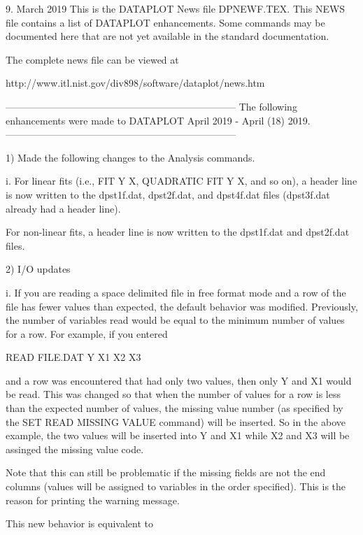 9.
                                                       March  2019
This is the DATAPLOT News file DPNEWF.TEX.  This NEWS file contains a
list of DATAPLOT enhancements.  Some commands may be documented here
that are not yet available in the standard documentation.

The complete news file can be viewed at

    http://www.itl.nist.gov/div898/software/dataplot/news.htm

-----------------------------------------------------------------------
The following enhancements were made to DATAPLOT
April 2019 - April (18) 2019.
-----------------------------------------------------------------------

 1) Made the following changes to the Analysis commands.

      i. For linear fits (i.e., FIT Y X, QUADRATIC FIT Y X, and so on), a
         header line is now written to the dpst1f.dat, dpst2f.dat, and
         dpst4f.dat files (dpst3f.dat already had a header line).

         For non-linear fits, a header line is now written to the dpst1f.dat
         and dpst2f.dat files.

 2) I/O updates

      i. If you are reading a space delimited file in free format mode
         and a row of the file has fewer values than expected, the
         default behavior was modified.  Previously, the number of
         variables read would be equal to the minimum number of values
         for a row.  For example, if you entered

             READ FILE.DAT Y X1 X2 X3

         and a row was encountered that had only two values, then only
         Y and X1 would be read.  This was changed so that when the number
         of values for a row is less than the expected number of values,
         the missing value number (as specified by the SET READ MISSING
         VALUE command) will be inserted.  So in the above example, the
         two values will be inserted into Y and X1 while X2 and X3 will be
         assinged the missing value code.

         Note that this can still be problematic if the missing fields are
         not the end columns (values will be assigned to variables in the
         order specified).  This is the reason for printing the warning
         message.

         This new behavior is equivalent to

